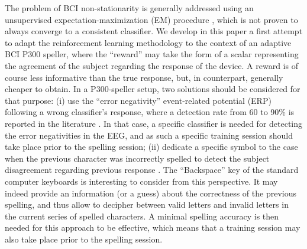 \documentclass[conference]{IEEEtran}
\begin{document}
The problem of BCI non-stationarity is generally addressed using an unsupervised expectation-maximi\-zation (EM) 
procedure \cite{Li06,Lu09,Kindermans12}, which is not proven to always converge to a consistent classifier.
We develop in this paper a  first attempt to adapt the  
reinforcement learning methodology \cite{Sutton98}
to the context of an adaptive BCI P300 speller,
where the ``reward'' may take the form of a scalar 
representing the agreement of the subject
regarding the response of the device.
A reward is of course less informative than the true response, but, 
in counterpart, generally cheaper to obtain. 
In a P300-speller setup, two solutions should be considered for that purpose: (i)
use the ``error negativity'' event-related potential (ERP) following a wrong classifier's response, where a detection 
rate from 60 to 90\% is reported in the literature \cite{Buttfield06,dalSeno10,Schmidt12}. 
In that case, a specific classifier is needed for detecting the error negativities in the EEG, 
and as such a specific training session should
take place prior to the spelling session; (ii) dedicate a 
specific symbol to the case when the previous character
was incorrectly spelled  to
detect the subject disagreement regarding previous response \cite{Dauce13}. 
The ``Backspace'' key of the standard computer keyboards is interesting to consider 
from this perspective. 
It may indeed provide an information (or a guess) about the correctness of the previous spelling, 
and thus allow to decipher between valid letters and invalid letters in the current series of spelled characters. 
A minimal spelling accuracy 
is then needed for this approach to be effective, which means that a training 
session may also take place prior to the spelling session.
\end{document}
